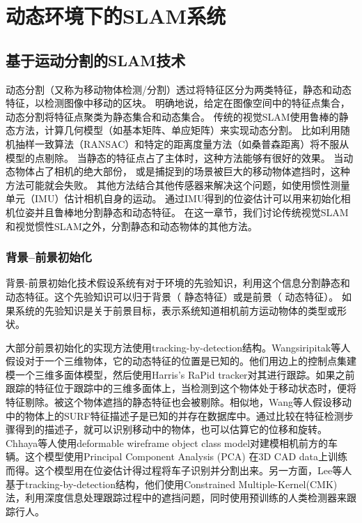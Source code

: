 \section{动态环境下的SLAM系统}
\subsection{基于运动分割的SLAM技术}
\label{subsec:motion_segmentation}
动态分割（又称为移动物体检测/分割\cite{Derome2015Moving, Klappstein2008Moving, kundu2009movingA}）透过将特征区分为两类特征，静态和动态特征，以检测图像中移动的区块。
明确地说，给定在图像空间中的特征点集合，动态分割将特征点聚类为静态集合和动态集合。
传统的视觉SLAM使用鲁棒的静态方法，计算几何模型（如基本矩阵、单应矩阵）来实现动态分割。
比如利用随机抽样一致算法（RANSAC）\cite{fischler1981randomA}和特定的距离度量方法（如桑普森距离\cite{Hartley2008Multiple}）将不服从模型的点剔除。
当静态的特征点占了主体时，这种方法能够有很好的效果。
当动态物体占了相机的绝大部份， 或是捕捉到的场景被巨大的移动物体遮挡时，这种方法可能就会失败。
其他方法结合其他传感器来解决这个问题，如使用惯性测量单元（IMU）估计相机自身的运动\cite{Jones2011Visual, Leutenegger2014Keyframe}。
通过IMU得到的位姿估计可以用来初始化相机位姿并且鲁棒地分割静态和动态特征。
在这一章节，我们讨论传统视觉SLAM和视觉惯性SLAM之外，分割静态和动态物体的其他方法。

\subsubsection{背景--前景初始化}
背景-前景初始化技术假设系统有对于环境的先验知识，利用这个信息分割静态和动态特征。这个先验知识可以归于背景（ 静态特征）或是前景（ 动态特征）。
如果系统的先验知识是关于前景目标，表示系统知道相机前方运动物体的类型或形状。

大部分前景初始化的实现方法使用tracking-by-detection结构\cite{Breitenstein2010Online, Lee2014Driving}。Wangsiripitak等人\cite{Wangsiripitak2009Avoiding}假设对于一个三维物体，它的动态特征的位置是已知的。他们用边上的控制点集建模一个三维多面体模型，然后使用Harris’s RaPid tracker\cite{Harris1990RAPID}对其进行跟踪。如果之前跟踪的特征位于跟踪中的三维多面体上，当检测到这个物体处于移动状态时，便将特征剔除。被这个物体遮挡的静态特征也会被剔除。相似地，Wang等人\cite{Wang2010Visual}假设移动中的物体上的SURF特征描述子\cite{Bay2008Speeded}是已知的并存在数据库中。通过比较在特征检测步骤得到的描述子，就可以识别移动中的物体，也可以估算它的位移和旋转。Chhaya等人\cite{Chhaya2016Monocular}使用deformable wireframe object class model对建模相机前方的车辆。这个模型使用Principal Component Analysis (PCA) 在3D CAD data上训练而得。这个模型用在位姿估计得过程将车子识别并分割出来。另一方面，Lee等人\cite{Lee2014Driving, Lee2016Ground}基于tracking-by-detection结构，他们使用Constrained Multiple-Kernel(CMK)法，利用深度信息处理跟踪过程中的遮挡问题，同时使用预训练的人类检测器来跟踪行人。

